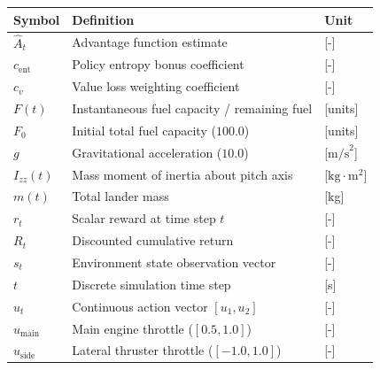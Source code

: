 \begin{longtable}{p{2.5cm}p{9.5cm}p{2.0cm}}
    \toprule
    Symbol                   & Definition                                         & Unit                         \\
    \midrule\endhead
    $\hat{A}_t$              & Advantage function estimate                        & [-]                          \\
    $c_{\text{ent}}$         & Policy entropy bonus coefficient                   & [-]                          \\
    $c_v$                    & Value loss weighting coefficient                   & [-]                          \\
    $F(t)$                   & Instantaneous fuel capacity / remaining fuel       & [units]                      \\
    $F_0$                    & Initial total fuel capacity ($100.0$)              & [units]                      \\
    $g$                      & Gravitational acceleration ($10.0$)                & [$\text{m/s}^2$]             \\
    $I_{zz}(t)$              & Mass moment of inertia about pitch axis            & [$\text{kg}\cdot\text{m}^2$] \\
    $m(t)$                   & Total lander mass                                  & [kg]                         \\
    $r_t$                    & Scalar reward at time step $t$                     & [-]                          \\
    $R_t$                    & Discounted cumulative return                       & [-]                          \\
    $s_t$                    & Environment state observation vector               & [-]                          \\
    $t$                      & Discrete simulation time step                      & [s]                          \\
    $u_t$                    & Continuous action vector $[u_1, u_2]$              & [-]                          \\
    $u_{\text{main}}$        & Main engine throttle ($[0.5, 1.0]$)                & [-]                          \\
    $u_{\text{side}}$        & Lateral thruster throttle ($[-1.0, 1.0]$)          & [-]                          \\

\end{longtable}
